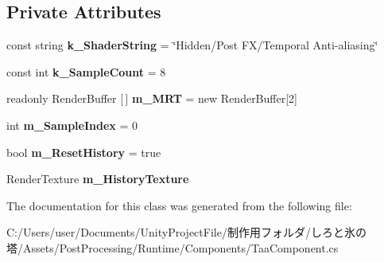 \subsection*{Private Attributes}
\begin{DoxyCompactItemize}
\item 
\mbox{\label{class_unity_engine_1_1_post_processing_1_1_taa_component_a207cefcaa1f39a3ed7303a60d17b29e6}} 
const string {\bfseries k\+\_\+\+Shader\+String} = \char`\"{}Hidden/Post FX/Temporal Anti-\/aliasing\char`\"{}
\item 
\mbox{\label{class_unity_engine_1_1_post_processing_1_1_taa_component_a4e722ab40f3793a419aedbff885f5c71}} 
const int {\bfseries k\+\_\+\+Sample\+Count} = 8
\item 
\mbox{\label{class_unity_engine_1_1_post_processing_1_1_taa_component_aafbe159c8f3c646bc167d9fd5e7547f3}} 
readonly Render\+Buffer \mbox{[}$\,$\mbox{]} {\bfseries m\+\_\+\+M\+RT} = new Render\+Buffer\mbox{[}2\mbox{]}
\item 
\mbox{\label{class_unity_engine_1_1_post_processing_1_1_taa_component_a480aa66771218e22a32a05fb76541208}} 
int {\bfseries m\+\_\+\+Sample\+Index} = 0
\item 
\mbox{\label{class_unity_engine_1_1_post_processing_1_1_taa_component_a3f259591fb3fd6deaa45918559f326d2}} 
bool {\bfseries m\+\_\+\+Reset\+History} = true
\item 
\mbox{\label{class_unity_engine_1_1_post_processing_1_1_taa_component_a706d4f067e0dc03b16eedc691344a707}} 
Render\+Texture {\bfseries m\+\_\+\+History\+Texture}
\end{DoxyCompactItemize}


The documentation for this class was generated from the following file\+:\begin{DoxyCompactItemize}
\item 
C\+:/\+Users/user/\+Documents/\+Unity\+Project\+File/制作用フォルダ/しろと氷の塔/\+Assets/\+Post\+Processing/\+Runtime/\+Components/Taa\+Component.\+cs\end{DoxyCompactItemize}
